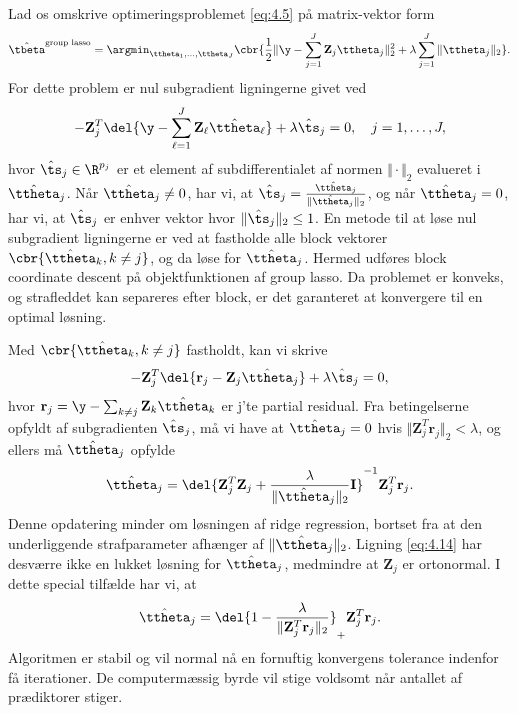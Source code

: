 Lad os omskrive optimeringsproblemet \eqref{eq:4.5} på matrix-vektor form
\begin{align}
\hat{\tbeta}^{\text{group lasso}} = \argmin_{\ttheta_1, \ldots, \ttheta_J} \cbr{\frac{1}{2} \Vert \y - \sum_{j=1}^J \mathbf{Z}_{j} \ttheta_j \Vert_2^2 + \lambda \sum_{j=1}^J \Vert \ttheta_j \Vert_2}. \label{eq:4.11}
\end{align}
For dette problem er nul subgradient ligningerne givet ved
\begin{align*}
- \mathbf{Z}_{j}^T \del{\y - \sum_{\ell=1}^J \mathbf{Z}_\ell \hat{\ttheta}_\ell} + \lambda \hat{\ts}_j = 0, \quad j=1,\ldots, J,
\end{align*} 
hvor $\hat{\ts}_j \in \R^{p_j}$ er et element af subdifferentialet af normen $\Vert \cdot \Vert_2$ evalueret i $\hat{\ttheta}_j$.
Når $\hat{\ttheta}_j \neq 0$, har vi, at $\hat{\ts}_j = \frac{\hat{\ttheta}_j}{\Vert \hat{\ttheta}_j \Vert_2}$, og når $\hat{\ttheta}_j=0$, har vi, at $\hat{\ts}_j$ er enhver vektor hvor $\Vert \hat{\ts}_j \Vert_2 \leq 1$.
En metode til at løse nul subgradient ligningerne er ved at fastholde alle block vektorer $\cbr{\hat{\ttheta}_k, k \neq j}$, og da løse for $\hat{\ttheta}_j$.
Hermed udføres block coordinate descent på objektfunktionen af group lasso.
Da problemet er konveks, og strafleddet kan separeres efter block, er det garanteret at konvergere til en optimal løsning.

Med $\cbr{\hat{\ttheta}_k, k \neq j}$ fastholdt, kan vi skrive
\begin{align*}
- \mathbf{Z}_{j}^T \del{\mathbf{r}_j - \mathbf{Z}_j \hat{\ttheta}_j} + \lambda \hat{\ts}_j = 0,
\end{align*}
hvor $\mathbf{r}_j = \y - \sum_{k \neq j} \mathbf{Z}_k \hat{\ttheta}_k $ er j'te partial residual.
Fra betingelserne opfyldt af subgradienten $\hat{\ts}_j$, må vi have at $\hat{\ttheta}_j =0$ hvis $\Vert \mathbf{Z}_j^T \mathbf{r}_j \Vert_2 < \lambda$, og ellers må $\hat{\ttheta}_j$ opfylde
\begin{align}
\hat{\ttheta}_j = \del{\mathbf{Z}_j^T \mathbf{Z}_j + \frac{\lambda}{\Vert \hat{\ttheta}_j \Vert_2} \mathbf{I}}^{-1} \mathbf{Z}_j^T \mathbf{r}_j. \label{eq:4.14}
\end{align}
Denne opdatering minder om løsningen af ridge regression, bortset fra at den underliggende strafparameter afhænger af $\Vert \hat{\ttheta}_j \Vert_2$.
Ligning \eqref{eq:4.14} har desværre ikke en lukket løsning for $\hat{\ttheta}_j$, medmindre at $\mathbf{Z}_j$ er ortonormal. 
I dette special tilfælde har vi, at
\begin{align*}
\hat{\ttheta}_j = \del{1 - \frac{\lambda}{\Vert \mathbf{Z}_j^T \mathbf{r}_j \Vert_2}}_+  \mathbf{Z}_j^T \mathbf{r}_j.
\end{align*}
Algoritmen er stabil og vil normal nå en fornuftig konvergens tolerance indenfor få iterationer.
De computermæssig byrde vil stige voldsomt når antallet af prædiktorer stiger.



